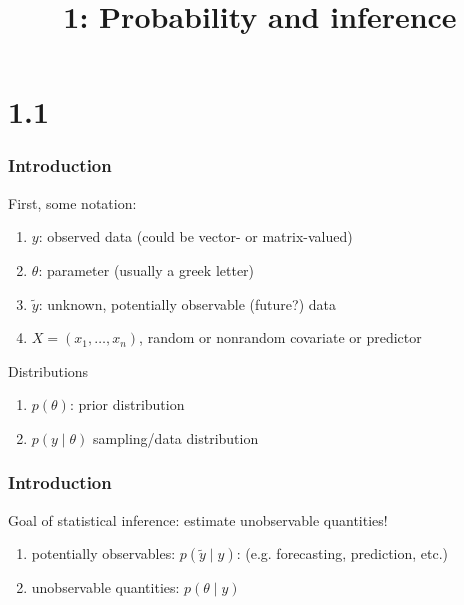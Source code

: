 \documentclass{beamer}
\title["1"]{1: Probability and inference}
\begin{document}

\begin{frame}
\titlepage 
\end{frame}

\section{1.1}

\begin{frame}
\frametitle{Introduction}

First, some notation:

\begin{enumerate}
\item $y$: observed data (could be vector- or matrix-valued)
\item $\theta$: parameter (usually a greek letter)
\item $\tilde{y}$: unknown, potentially observable (future?) data
\item $X = (x_1, \ldots, x_n)$, random or nonrandom covariate or predictor
\end{enumerate}
\pause

Distributions
\begin{enumerate}
\item $p(\theta)$: prior distribution
\item $p(y \mid \theta)$ sampling/data distribution
\end{enumerate}

\end{frame}

\begin{frame}
\frametitle{Introduction}

Goal of statistical inference: estimate unobservable quantities!
\begin{enumerate}
\item potentially observables: $p(\tilde{y} \mid y)$:  (e.g. forecasting, prediction, etc.)
\item unobservable quantities: $p(\theta \mid y)$  
\end{enumerate}


\end{frame}
\end{document}
